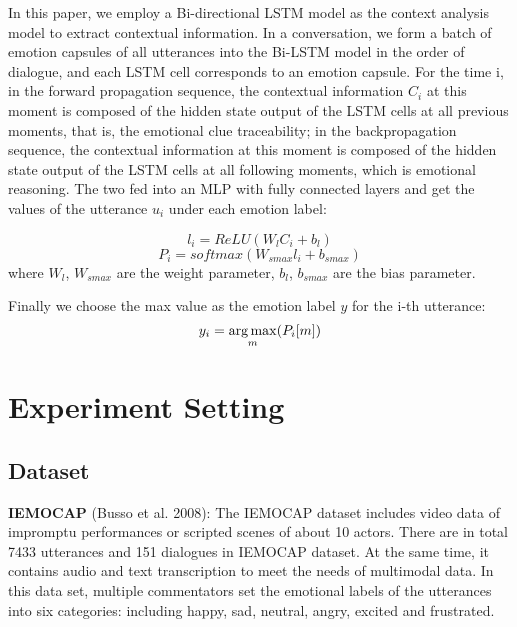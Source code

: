 In this paper, we employ a Bi-directional LSTM model as the context analysis model to extract contextual information. 
In a conversation, we form a batch of emotion capsules of all utterances into the Bi-LSTM model in the order of dialogue, and each LSTM cell corresponds to an emotion capsule.  For the time i, in the forward propagation sequence, the contextual information $C_i$ at this moment is composed of the hidden state output of the LSTM cells at all previous moments, that is, the emotional clue traceability; in the backpropagation sequence, the contextual information at this moment is composed of the hidden state output of the LSTM cells at all following moments, which is emotional reasoning. The two fed into an MLP with fully connected layers and get the values of the utterance $u_i$ under each emotion label:

\begin{equation}
	l_i=ReLU(W_l C_i+b_l)
\end{equation}	
\begin{equation}
	P_i=softmax(W_{smax} l_i+b_{smax})
\end{equation}
where $W_l$, $W_{smax}$ are the weight parameter, $b_l$, $b_{smax}$ are the bias parameter.

Finally we choose the max value as the emotion label $y$ for the i-th utterance:
\begin{equation}
	y_i=\mathop{\arg\max}_{m}(P_i [m])\vspace{0.5ex}
\end{equation}

\section{Experiment Setting}

\subsection{Dataset}
\noindent\textbf{IEMOCAP} (Busso et al. 2008): The IEMOCAP dataset includes video data of impromptu performances or scripted scenes of about 10 actors. There are in total 7433 utterances and 151 dialogues in IEMOCAP dataset. At the same time, it contains audio and text transcription to meet the needs of multimodal data. In this data set, multiple commentators set the emotional labels of the utterances into six categories: including happy, sad, neutral, angry, excited and frustrated.

